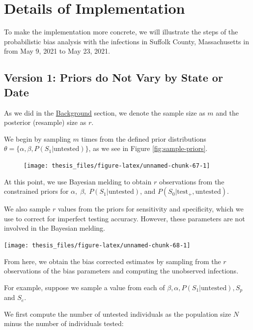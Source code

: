 \documentclass[12pt,twoside]{smiththesis}
\begin{document}
\hypertarget{details-of-implementation}{%
\chapter{Details of Implementation}\label{details-of-implementation}}

To make the implementation more concrete, we will illustrate the steps of the probabilistic bias analysis with the infections in Suffolk County, Massachusetts in from May 9, 2021 to May 23, 2021.

\hypertarget{version-1-priors-do-not-vary-by-state-or-date}{%
\section{Version 1: Priors do Not Vary by State or Date}\label{version-1-priors-do-not-vary-by-state-or-date}}

As we did in the \protect\hyperlink{sampling}{Background} section, we denote the sample size as \(m\) and the posterior (resample) size as \(r\).

We begin by sampling \(m\) times from the defined prior distributions \(\theta = \Big\{ \alpha, \beta, P(S_1| \text{untested})\Big\}\), as we see in Figure \ref{fig:sample-priors}.
\begin{figure}
\texttt{[image: thesis\_files/figure-latex/unnamed-chunk-67-1]} \caption{\label{fig:sample-priors}}\label{fig:unnamed-chunk-67}
\end{figure}
At this point, we use Bayesian melding to obtain \(r\) observations from the constrained priors for \(\alpha, \; \beta, \;P(S_1|\text{untested})\), and \(P(S_0|\text{test}_+,\text{untested})\).

We also sample \(r\) values from the priors for sensitivity and specificity, which we use to correct for imperfect testing accuracy. However, these parameters are not involved in the Bayesian melding.

\texttt{[image: thesis\_files/figure-latex/unnamed-chunk-68-1]}

From here, we obtain the bias corrected estimates by sampling from the \(r\) observations of the bias parameters and computing the unobserved infections.

For example, suppose we sample a value from each of \(\beta,\alpha,P(S_1|\text{untested}), S_p\) and \(S_e\).

We first compute the number of untested individuals as the population size \(N\) minus the number of individuals tested:
\end{document}

